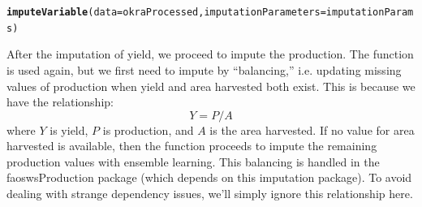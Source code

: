 \documentclass[nojss]{jss}\usepackage[]{graphicx}\usepackage[]{color}
\makeatletter
\newcommand{\hlstd}[1]{\textcolor[rgb]{0.345,0.345,0.345}{#1}}%
\newcommand{\hlkwc}[1]{\textcolor[rgb]{0.333,0.667,0.333}{#1}}%
\newcommand{\hlkwd}[1]{\textcolor[rgb]{0.737,0.353,0.396}{\textbf{#1}}}%
\newenvironment{kframe}{%
 \def\at@end@of@kframe{}%
 \ifinner\ifhmode%
  \def\at@end@of@kframe{\end{minipage}}%
  \begin{minipage}{\columnwidth}%
 \fi\fi%
 \def\FrameCommand##1{\hskip\@totalleftmargin \hskip-\fboxsep
 \colorbox{shadecolor}{##1}\hskip-\fboxsep
     \hskip-\linewidth \hskip-\@totalleftmargin \hskip\columnwidth}%
 \MakeFramed {\advance\hsize-\width
   \@totalleftmargin\z@ \linewidth\hsize
   \@setminipage}}%
 {\par\unskip\endMakeFramed%
 \at@end@of@kframe}
\newenvironment{knitrout}{}{} %
\makeatother
\begin{document}
\begin{knitrout}
\color{fgcolor}\begin{kframe}
\begin{alltt}
\hlkwd{imputeVariable}\hlstd{(}\hlkwc{data} \hlstd{= okraProcessed,} \hlkwc{imputationParameters} \hlstd{= imputationParams)}
\end{alltt}
\end{kframe}
\end{knitrout}

After the imputation of yield, we proceed to impute the production.  The
function  is used again, but we first need to impute
by ``balancing,'' i.e. updating missing values of production when yield and
area harvested both exist.  This is because we have the relationship:
$$Y = P / A$$
where $Y$ is yield, $P$ is production, and $A$ is the area harvested.
If no value for area harvested is available, then the function proceeds to
impute the remaining production values with ensemble learning.  This balancing
is handled in the faoswsProduction package (which depends on this imputation
package).  To avoid dealing with strange dependency issues, we'll simply ignore
this relationship here.
\end{document}
